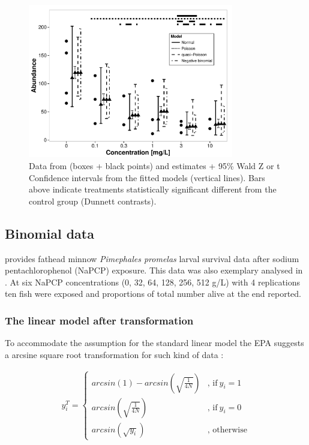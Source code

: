 \documentclass{scrartcl}
\begin{document}
\begin{figure}[h]
  \centering
  \includegraphics[width = 0.8\textwidth]{example.pdf}
  \caption{Data from \citet{brock_minimum_2014} (boxes + black points) and estimates + 95\% Wald Z or t Confidence intervals from the fitted models (vertical lines). 
  Bars above indicate treatments statistically significant different from the control group (Dunnett contrasts).}
  \label{fig:example}
\end{figure}


\subsection{Binomial data}
\citet{weber_short-term_1989} provides fathead minnow \textit{Pimephales promelas} larval survival data after sodium pentachlorophenol (NaPCP) exposure.
This data was also exemplary analysed in \citet{newman_quantitative_2012}.
At six NaPCP concentrations (0, 32, 64, 128, 256, 512 \textmu g/L) with 4 replications ten fish were exposed and proportions of total number alive at the end reported.

\subsubsection{The linear model after transformation}
To accommodate the assumption for the standard linear model the EPA suggests a arcsine square root transformation for such kind of data \cite{epa_methods_2002}:

\begin{align}
  y_i^T = 
  \begin{cases}  
    arcsin(1) - arcsin(\sqrt{\frac{1}{4N}}) & \text{, if}\ y_i = 1 \\
    arcsin(\sqrt{\frac{1}{4N}}) & \text{, if}\ y_i = 0  \\
    arcsin(\sqrt{y_i}) & \text{, otherwise}
  \end{cases} \label{eqn:arcsine}
\end{align}
\end{document}

